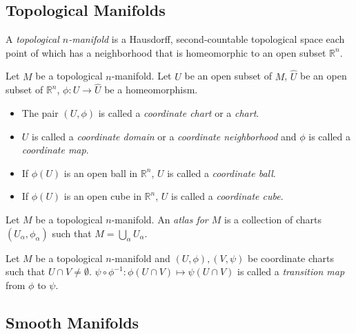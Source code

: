 \subsection{Topological Manifolds}

\begin{defn}
  A \textit{topological $n$-manifold} is a Hausdorff, second-countable topological space each point of which has a neighborhood that is homeomorphic to an open subset $\mathbb{R}^n$.
\end{defn}

\begin{defn}[Coordinates]
  Let $M$ be a topological $n$-manifold.
  Let $U$ be an open subset of $M$, $\hat{U}$ be an open subset of $\mathbb{R}^n$, $\phi: U \rightarrow \hat{U}$ be a homeomorphism.
  \begin{itemize}
    \item
      The pair $(U, \phi)$ is called a \textit{coordinate chart} or a \textit{chart}.
    \item
      $U$ is called a \textit{coordinate domain} or a \textit{coordinate neighborhood} and $\phi$ is called a \textit{coordinate map}.
    \item
      If $\phi(U)$ is an open ball in $\mathbb{R}^n$, $U$ is called a \textit{coordinate ball}.
    \item
      If $\phi(U)$ is an open cube in $\mathbb{R}^n$, $U$ is called a \textit{coordinate cube}.
  \end{itemize}
\end{defn}

\begin{defn}[Atlas]
  Let $M$ be a topological $n$-manifold.
  An \textit{atlas for $M$} is a collection of charts $(U_{\alpha}, \phi_{\alpha})$ such that $M = \bigcup_{\alpha} U_{\alpha}$.
\end{defn}

\begin{defn}
  Let $M$ be a topological $n$-manifold and $(U, \phi), (V, \psi)$ be coordinate charts such that $U \cap V \ne \emptyset$.
  $\psi \circ \phi^{-1}: \phi(U \cap V) \mapsto \psi(U \cap V)$ is called a \textit{transition map} from $\phi$ to $\psi$.
\end{defn}

\subsection{Smooth Manifolds}

